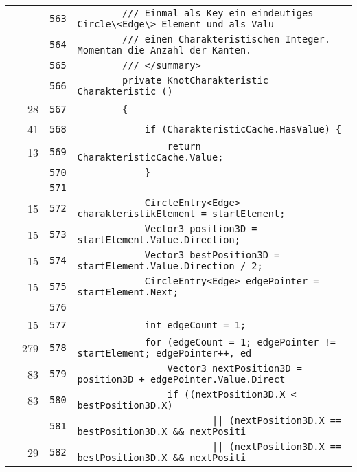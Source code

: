 \documentclass[a4paper,10pt]{article}
\begin{document}
\begin{longtable}[l]{lrrl}
\cellcolor{gray} &  & \verb~563~ & \verb~        /// Einmal als Key ein eindeutiges Circle\<Edge\> Element und als Valu~\\
\cellcolor{gray} &  & \verb~564~ & \verb~        /// einen Charakteristischen Integer. Momentan die Anzahl der Kanten.~\\
\cellcolor{gray} &  & \verb~565~ & \verb~        /// </summary>~\\
\cellcolor{gray} &  & \verb~566~ & \verb~        private KnotCharakteristic Charakteristic ()~\\
\cellcolor{green} & 28 & \verb~567~ & \verb~        {~\\
\cellcolor{green} & 41 & \verb~568~ & \verb~            if (CharakteristicCache.HasValue) {~\\
\cellcolor{green} & 13 & \verb~569~ & \verb~                return CharakteristicCache.Value;~\\
\cellcolor{gray} &  & \verb~570~ & \verb~            }~\\
\cellcolor{gray} &  & \verb~571~ & \verb~~\\
\cellcolor{green} & 15 & \verb~572~ & \verb~            CircleEntry<Edge> charakteristikElement = startElement;~\\
\cellcolor{green} & 15 & \verb~573~ & \verb~            Vector3 position3D = startElement.Value.Direction;~\\
\cellcolor{green} & 15 & \verb~574~ & \verb~            Vector3 bestPosition3D = startElement.Value.Direction / 2;~\\
\cellcolor{green} & 15 & \verb~575~ & \verb~            CircleEntry<Edge> edgePointer = startElement.Next;~\\
\cellcolor{gray} &  & \verb~576~ & \verb~~\\
\cellcolor{green} & 15 & \verb~577~ & \verb~            int edgeCount = 1;~\\
\cellcolor{green} & 279 & \verb~578~ & \verb~            for (edgeCount = 1; edgePointer != startElement; edgePointer++, ed~\\
\cellcolor{green} & 83 & \verb~579~ & \verb~                Vector3 nextPosition3D = position3D + edgePointer.Value.Direct~\\
\cellcolor{green} & 83 & \verb~580~ & \verb~                if ((nextPosition3D.X < bestPosition3D.X)~\\
\cellcolor{gray} &  & \verb~581~ & \verb~                        || (nextPosition3D.X == bestPosition3D.X && nextPositi~\\
\cellcolor{green} & 29 & \verb~582~ & \verb~                        || (nextPosition3D.X == bestPosition3D.X && nextPositi~\\

\end{longtable}
\end{document}
